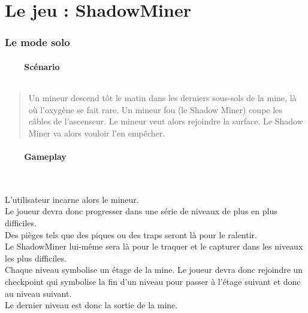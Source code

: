 \documentclass[titlepage, 13px, a4paper]{report}
\begin{document}


\newpage


\part{Le jeu : ShadowMiner}
\section{Le mode solo}

\subsection[Scénario]{~~~~Scénario}
\paragraph{} \hspace{0pt}
\begin{quotation}
	Un mineur descend tôt le matin dans les derniers sous-sols de la mine, là où l’oxygène se fait rare. 
	Un mineur fou (le Shadow Miner) coupe les câbles de l’ascenseur. 
	Le mineur veut alors rejoindre la surface. Le Shadow Miner va alors vouloir l’en empêcher. \\
\end{quotation}

\subsection[Gameplay]{~~~~Gameplay}
\paragraph{} \hspace{0pt} \\
L’utilisateur incarne alors le mineur. \\
Le joueur devra donc progresser dans une série de niveaux de plus en plus difficiles. \\
Des pièges tels que des piques ou des traps seront là pour le ralentir. \\
Le ShadowMiner lui-même sera là pour le traquer et le capturer dans les niveaux les plus difficiles. \\
Chaque niveau symbolise un étage de la mine. Le joueur devra donc rejoindre un checkpoint 
qui symbolise la fin d’un niveau pour passer à l’étage suivant et donc au niveau suivant. \\
Le dernier niveau est donc la sortie de la mine. \\ 
\end{document}
